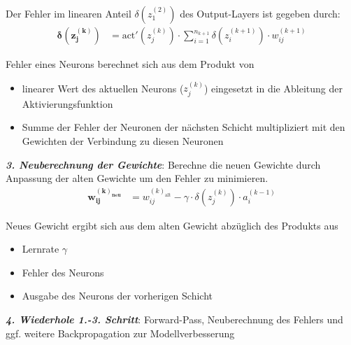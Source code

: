 Der Fehler im linearen Anteil $\delta(z_1^{(2)})$ des Output-Layers ist gegeben durch:
\begin{equation*}
    \begin{aligned}
        \boldsymbol{\delta(z_j^{(k)})}  &= \text{act}'(z_j^{(k)})\cdot\sum_{i=1}^{n_{k+1}}\delta(z_i^{(k+1)})\cdot w_{ij}^{(k+1)}
    \end{aligned}
\end{equation*}

Fehler eines Neurons berechnet sich aus dem Produkt von
\begin{itemize}
    \item linearer Wert des aktuellen Neurons ($z_j^{(k)}$) eingesetzt in die Ableitung der Aktivierungsfunktion
    \item Summe der Fehler der Neuronen der nächsten Schicht multipliziert mit den Gewichten der Verbindung zu diesen Neuronen\\
\end{itemize}

\emph{\textbf{3. Neuberechnung der Gewichte}}: Berechne die neuen Gewichte durch Anpassung der alten Gewichte um den Fehler zu minimieren.
\begin{equation*}
    \begin{aligned}
        \boldsymbol{w_{ij}^{(k)_\text{neu}}}  &= w_{ij}^{(k)_\text{alt}}-\gamma\cdot\delta(z_j^{(k)})\cdot a_i^{(k-1)}
    \end{aligned}
\end{equation*}

Neues Gewicht ergibt sich aus dem alten Gewicht abzüglich des Produkts aus
\begin{itemize}
    \item Lernrate $\gamma$
    \item Fehler des Neurons
    \item Ausgabe des Neurons der vorherigen Schicht\\
\end{itemize}

\emph{\textbf{4. Wiederhole 1.-3. Schritt}}: Forward-Pass, Neuberechnung des Fehlers und ggf. weitere Backpropagation zur Modellverbesserung
